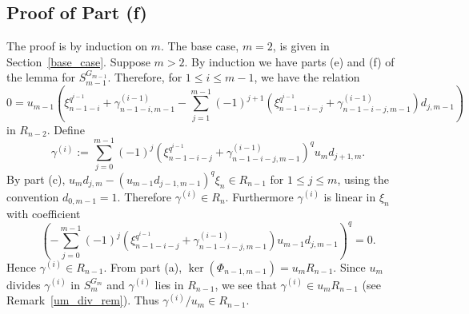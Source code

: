 \documentclass{amsart}
\begin{document}
\subsection{Proof of Part (f)}
The proof is by induction on $m$. 
The base case, $m=2$, is given in Section~\ref{base_case}. 
Suppose $m>2$. By induction we have parts (e) and (f) of the lemma for 
$S_{m-1}^{G_{m-1}}$. 
Therefore, for $1\leq i \leq m-1$, we have the relation
$$ 0=u_{m-1}\left(\xi_{n-1-i}^{q^{i-1}}+\gamma_{n-1-i,m-1}^{(i-1)}-\sum_{j=1}^{m-1}(-1)^{j+1}(\xi_{n-1-i-j}^{q^{i-1}}+\gamma_{n-1-i-j,m-1}^{(i-1)})d_{j,m-1}\right)$$
in $R_{n-2}$. Define
$$\gamma^{(i)}:=\sum_{j=0}^{m-1}(-1)^{j}(\xi_{n-1-i-j}^{q^{i-1}}+\gamma_{n-1-i-j,m-1}^{(i-1)})^q u_md_{j+1,m}.$$
By part (c), $u_m d_{j,m}-(u_{m-1}d_{j-1,m-1})^q\xi_{n}\in R_{n-1}$ for $1\leq j\leq m$, using the convention $d_{0,m-1}=1$.
Therefore $\gamma^{(i)}\in R_{n}$. Furthermore $\gamma^{(i)}$ is linear in $\xi_{n}$ with coefficient
$$\left(-\sum_{j=0}^{m-1}(-1)^{j}(\xi_{n-1-i-j}^{q^{i-1}}+\gamma_{n-1-i-j,m-1}^{(i-1)})u_{m-1}d_{j,m-1}\right)^q=0.$$
Hence $\gamma^{(i)}\in R_{n-1}$. From part (a), $\ker(\Phi_{n-1,m-1})=u_mR_{n-1}$. 
Since $u_m$ divides $\gamma^{(i)}$ in $S_m^{G_m}$ and $\gamma^{(i)}$ lies in $R_{n-1}$, we see that $\gamma^{(i)}\in u_mR_{n-1}$ (see Remark~\ref{um_div_rem}). Thus $\gamma^{(i)}/u_m\in R_{n-1}$.
\end{document}
